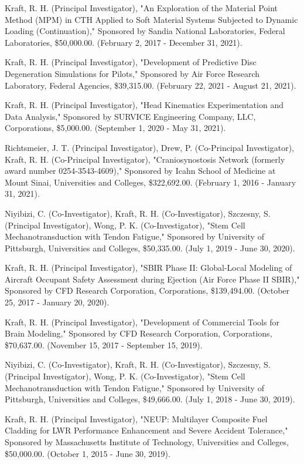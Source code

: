 \documentclass[
]{article}
\begin{document}
Kraft, R. H. (Principal Investigator), "An Exploration of the Material
Point Method (MPM) in CTH Applied to Soft Material Systems Subjected to
Dynamic Loading (Continuation)," Sponsored by Sandia National
Laboratories, Federal Laboratories, \$50,000.00. (February 2, 2017 -
December 31, 2021).

Kraft, R. H. (Principal Investigator), "Development of Predictive Disc
Degeneration Simulations for Pilots," Sponsored by Air Force Research
Laboratory, Federal Agencies, \$39,315.00. (February 22, 2021 - August
21, 2021).

Kraft, R. H. (Principal Investigator), "Head Kinematics Experimentation
and Data Analysis," Sponsored by SURVICE Engineering Company, LLC,
Corporations, \$5,000.00. (September 1, 2020 - May 31, 2021).

Richtsmeier, J. T. (Principal Investigator), Drew, P. (Co-Principal
Investigator), Kraft, R. H. (Co-Principal Investigator),
"Craniosynostosis Network (formerly award number 0254-3543-4609),"
Sponsored by Icahn School of Medicine at Mount Sinai, Universities and
Colleges, \$322,692.00. (February 1, 2016 - January 31, 2021).

Niyibizi, C. (Co-Investigator), Kraft, R. H. (Co-Investigator),
Szczesny, S. (Principal Investigator), Wong, P. K. (Co-Investigator),
"Stem Cell Mechanotransduction with Tendon Fatigue," Sponsored by
University of Pittsburgh, Universities and Colleges, \$50,335.00. (July
1, 2019 - June 30, 2020).

Kraft, R. H. (Principal Investigator), "SBIR Phase II: Global-Local
Modeling of Aircraft Occupant Safety Assessment during Ejection (Air
Force Phase II SBIR)," Sponsored by CFD Research Corporation,
Corporations, \$139,494.00. (October 25, 2017 - January 20, 2020).

Kraft, R. H. (Principal Investigator), "Development of Commercial Tools
for Brain Modeling," Sponsored by CFD Research Corporation,
Corporations, \$70,637.00. (November 15, 2017 - September 15, 2019).

Niyibizi, C. (Co-Investigator), Kraft, R. H. (Co-Investigator),
Szczesny, S. (Principal Investigator), Wong, P. K. (Co-Investigator),
"Stem Cell Mechanotransduction with Tendon Fatigue," Sponsored by
University of Pittsburgh, Universities and Colleges, \$49,666.00. (July
1, 2018 - June 30, 2019).

Kraft, R. H. (Principal Investigator), "NEUP: Multilayer Composite Fuel
Cladding for LWR Performance Enhancement and Severe Accident Tolerance,"
Sponsored by Massachusetts Institute of Technology, Universities and
Colleges, \$50,000.00. (October 1, 2015 - June 30, 2019).
\end{document}

